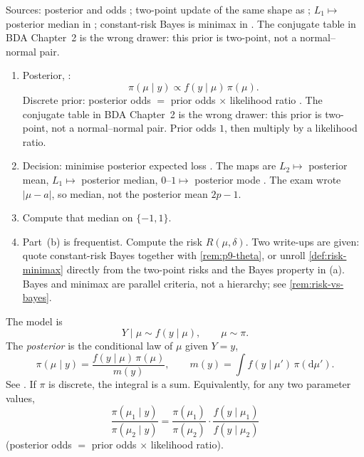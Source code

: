 \documentclass[11pt,a4paper]{article}
\begin{document}
Sources: posterior and odds \citep[\S1.3, (1.5)]{gelman2013}; two-point update of the same shape as \citep[\S1.4]{gelman2013}; \(L_1\mapsto\) posterior median in \citep{gelmannotes}; constant-risk Bayes is minimax in \citep[\S7.1]{hogg2019}. The conjugate table in BDA Chapter~2 is the wrong drawer: this prior is two-point, not a normal--normal pair.

\begin{remark}
\label{rem:p9-bda-steps}
\begin{enumerate}[label=\textup{(\arabic*)}]
    \item
    Posterior, \citep[\S1.3]{gelman2013}:
    \[
    \pi(\mu\mid y)\propto f(y\mid\mu)\,\pi(\mu).
    \]
    Discrete prior: posterior odds \(=\) prior odds \(\times\) likelihood ratio \citep[(1.5)]{gelman2013}. The conjugate table in BDA Chapter~2 is the wrong drawer: this prior is two-point, not a normal--normal pair. Prior odds \(1\), then multiply by a likelihood ratio.
    \item
    Decision: minimise posterior expected loss \citep[Chapter~9]{gelman2013}. The maps are \(L_2\mapsto\) posterior mean, \(L_1\mapsto\) posterior median, \(0\)--\(1\mapsto\) posterior mode \citep{gelmannotes}. The exam wrote \(|\mu-a|\), so median, not the posterior mean \(2p-1\).
    \item
    Compute that median on \(\{-1,1\}\).
    \item
    Part~(b) is frequentist. Compute the risk \(R(\mu,\delta)\). Two write-ups are given: quote constant-risk Bayes \citep[\S7.1]{hogg2019} together with \cref{rem:p9-theta}, or unroll \cref{def:risk-minimax} directly from the two-point risks and the Bayes property in (a). Bayes and minimax are parallel criteria, not a hierarchy; see \cref{rem:risk-vs-bayes}.
\end{enumerate}
\end{remark}

\begin{definition}
\label{def:prior-posterior}
The model is
\[
Y\mid\mu\sim f(y\mid\mu),
\qquad
\mu\sim\pi.
\]
The \emph{posterior} is the conditional law of \(\mu\) given \(Y=y\),
\[
\pi(\mu\mid y)
=
\frac{f(y\mid\mu)\,\pi(\mu)}{m(y)},
\qquad
m(y)
=
\int f(y\mid\mu')\,\pi(\mathrm{d}\mu').
\]
See \citep[\S1.3, (1.5)]{gelman2013}. If \(\pi\) is discrete, the integral is a sum. Equivalently, for any two parameter values,
\[
\frac{\pi(\mu_1\mid y)}{\pi(\mu_2\mid y)}
=
\frac{\pi(\mu_1)}{\pi(\mu_2)}
\cdot
\frac{f(y\mid\mu_1)}{f(y\mid\mu_2)}
\]
(posterior odds \(=\) prior odds \(\times\) likelihood ratio).
\end{definition}
\end{document}
